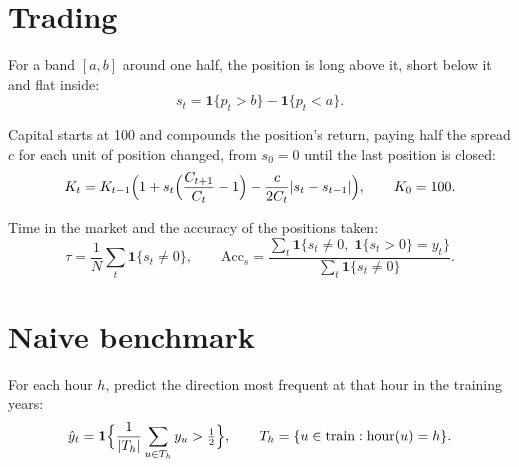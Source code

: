 \documentclass[11pt]{article}
\begin{document}
\section{Trading}

For a band $[a, b]$ around one half, the position is long above it, short
below it and flat inside:
\begin{equation}
  s_t = \mathbf{1}\{p_t > b\} - \mathbf{1}\{p_t < a\}.
\end{equation}

Capital starts at 100 and compounds the position's return, paying half
the spread $c$ for each unit of position changed, from $s_0 = 0$ until the
last position is closed:
\begin{equation}
  K_t = K_{t-1} \Bigl(1 + s_t \Bigl(\frac{C_{t+1}}{C_t} - 1\Bigr)
    - \frac{c}{2 C_t} \lvert s_t - s_{t-1} \rvert\Bigr), \qquad
  K_0 = 100.
\end{equation}

Time in the market and the accuracy of the positions taken:
\begin{equation}
  \tau = \frac{1}{N} \sum_t \mathbf{1}\{s_t \neq 0\}, \qquad
  \mathrm{Acc}_s = \frac{\sum_t \mathbf{1}\{s_t \neq 0,\;
    \mathbf{1}\{s_t > 0\} = y_t\}}{\sum_t \mathbf{1}\{s_t \neq 0\}}.
\end{equation}

\section{Naive benchmark}

For each hour $h$, predict the direction most frequent at that hour in
the training years:
\begin{equation}
  \hat y_t = \mathbf{1}\Bigl\{\frac{1}{\lvert T_h \rvert}
    \sum_{u \in T_h} y_u > \tfrac{1}{2}\Bigr\}, \qquad
  T_h = \{u \in \text{train} : \mathrm{hour}(u) = h\}.
\end{equation}
\end{document}
